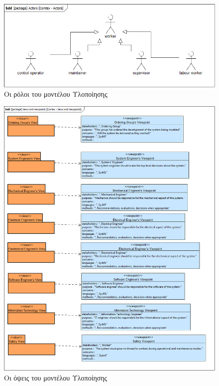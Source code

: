 \documentclass[a4paper,12pt,twoside]{report}
\begin{document}
\begin{appendices}
				\begin{figure}[hp]
					\centering
					\includegraphics[scale=0.50]{DesignModel_Contex-Actors.png}
					\caption{Οι ρόλοι του μοντέλου Υλοποίησης}
					\label{φωτ:Οι ρόλοι του μοντέλου Υλοποίησης}
				\end{figure}
				
				\begin{figure}[hp]
					\centering
					\includegraphics[scale=0.30]{DesignModel_Contex-ViewsandViewpoints.png}
					\caption{Οι όψεις του μοντέλου Υλοποίησης}
					\label{φωτ:Οι όψεις του μοντέλου Υλοποίησης}
				\end{figure}
				

\end{appendices}
\end{document}
